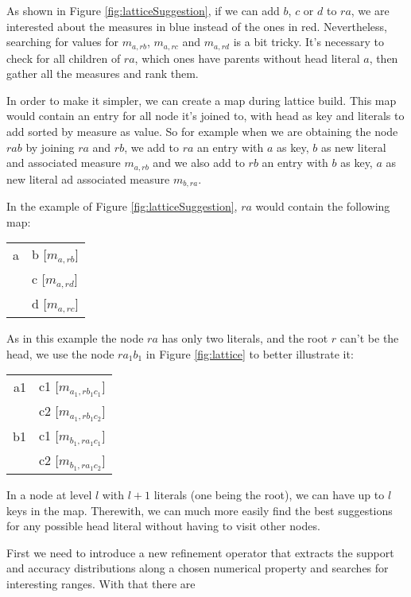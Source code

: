 As shown in Figure \ref{fig:latticeSuggestion}, if we can add $b$, $c$ or $d$ to $ra$, we are interested about the
measures in blue instead of the ones in red. Nevertheless, searching for values for $m_{a,rb}$, $m_{a,rc}$ and
$m_{a,rd}$ is a bit tricky. It's necessary to check for all children of $ra$, which ones have parents without head
literal $a$, then gather all the measures and rank them.

In order to make it simpler, we can create a map during lattice build. This map would contain an entry for all node
it's joined to, with head as key and literals to add sorted by measure as value. So for example when we are obtaining
the node $rab$ by joining $ra$ and $rb$, we add to $ra$ an entry with $a$ as key, $b$ as new literal and
associated measure $m_{a,rb}$ and we also add to $rb$ an entry with $b$ as key, $a$ as new literal ad associated
measure $m_{b,ra}$. 

In the example of Figure \ref{fig:latticeSuggestion}, $ra$ would contain the following map:

\begin{center}
  \begin{tabular}{r | l}
    a & b [$m_{a,rb}$] \\
      & c [$m_{a,rd}$] \\
      & d [$m_{a,rc}$]
  \end{tabular}
\end{center}

As in this example the node $ra$ has only two literals, and the root $r$ can't be the head, we use the node $ra_1b_1$
in Figure \ref{fig:lattice} to better illustrate it:

\begin{center}
  \begin{tabular}{r | l}
    a1 	& c1 [$m_{a_1,rb_1c_1}$] \\
	& c2 [$m_{a_1,rb_1c_2}$] \\
    \hline
    b1	& c1 [$m_{b_1,ra_1c_1}$] \\
	& c2 [$m_{b_1,ra_1c_2}$]
  \end{tabular}
\end{center}

In a node at level $l$ with $l+1$ literals (one being the root), we can have up to $l$ keys in the map. Therewith, we
can much more easily find the best suggestions for any possible head literal without having to visit other nodes.

First we need to introduce a new refinement operator that extracts the support and accuracy distributions along a chosen
numerical property and searches for interesting ranges. With that there are

